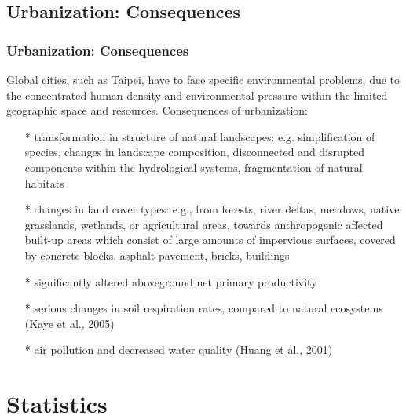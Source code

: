\documentclass[pdflatex,compress,8pt,
	xcolor={dvipsnames,dvipsnames,svgnames,x11names,table},
	hyperref={colorlinks = true,breaklinks = true, urlcolor = NavyBlue, breaklinks = true}]{beamer}
\begin{document}
\subsection{Urbanization: Consequences}
\begin{frame}\frametitle{Urbanization: Consequences}
Global cities, such as Taipei, have to face specific environmental problems, due to the concentrated human density and environmental pressure within the limited geographic space and resources. Consequences of urbanization:

\begin{itemize}
	\item [*] transformation in structure of natural landscapes: e.g. simplification of species, changes in landscape composition, disconnected and disrupted components within the hydrological systems, fragmentation of natural habitats
	\item [*] changes in land cover types: e.g., from forests, river deltas, meadows, native grasslands, wetlands, or agricultural areas, towards anthropogenic affected built-up areas which consist of large amounts of impervious surfaces, covered by concrete blocks, asphalt pavement, bricks, buildings
	\item [*] significantly altered aboveground net primary productivity
	\item [*] serious changes in soil respiration rates, compared to natural ecosystems (Kaye et al., 2005)
	\item [*] air pollution and decreased water quality (Huang et al., 2001)
\end{itemize}
\end{frame}

\section{Statistics}
\end{document}
